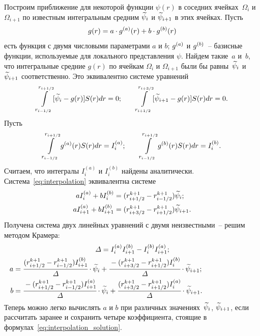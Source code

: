 Построим приближение для некоторой функции $\psi(r)$ в соседних ячейках~$\Omega_i$ и~$\Omega_{i + 1}$ по известным интегральным средним ${\widetilde{\psi}}_i$ и ${\widetilde{\psi}}_{i + 1}$ в этих ячейках. Пусть
\[
    g(r) = a \cdot {g^{(a)}}(r) + b \cdot {g^{(b)}}(r)
\]
есть функция с двумя числовыми параметрами $a$ и $b$; ${g^{(a)}}$ и ${g^{(b)}}$~-- базисные функции, используемые для локального представления $\psi$. Найдем такие~$a$ и~$b$, что интегральные средние $g(r)$ по ячейкам $\Omega_i$ и $\Omega_{i + 1}$ были бы равны~${\widetilde{\psi}}_i$ и~${\widetilde{\psi}}_{i + 1}$ соответственно. Это эквивалентно системе уравнений
\begin{equation}
    \int\limits_{r_{i - 1/2}}^{r_{i + 1/2}} [{\widetilde{\psi}}_i - g(r)] S(r) dr = 0; \qquad \int\limits_{r_{i + 1/2}}^{r_{i + 3/2}} [{\widetilde{\psi}}_{i + 1} - g(r)] S(r) dr = 0.
    \label{eq:interpolation}
\end{equation}
Пусть
\[
    \int\limits_{r_{i - 1/2}}^{r_{i + 1/2}} {g^{(a)}}(r) S(r) dr = I_i^{(a)}; \qquad \int\limits_{r_{i - 1/2}}^{r_{i + 1/2}} {g^{(b)}}(r) S(r) dr = I_i^{(b)}.
\]
Считаем, что интегралы $I_i^{(a)}$ и $I_i^{(b)}$ найдены аналитически. Система~\eqref{eq:interpolation} эквивалентна системе
\begin{align*}
    a I_i^{(a)} + b I_i^{(b)} &= (r_{i + 1/2}^{k + 1} - r_{i - 1/2}^{k + 1}) {\widetilde{\psi}}_i; \\
    a I_{i + 1}^{(a)} + b I_{i + 1}^{(b)} &= (r_{i + 3/2}^{k + 1} - r_{i + 1/2}^{k + 1}) {\widetilde{\psi}}_{i + 1}.
\end{align*}
Получена система двух линейных уравнений с двумя неизвестными~-- решим методом Крамера:
\begin{subequations}
\label{eq:interpolation_solution}
\begin{align}
    \noalign{
        \centering
        $\varDelta = I_i^{(a)} I_{i + 1}^{(b)} - I_i^{(b)} I_{i + 1}^{(a)};$
    }
    a &= \cfrac{(r_{i + 1/2}^{k + 1} - r_{i - 1/2}^{k + 1}) I_{i + 1}^{(b)}}{\varDelta} \cdot \avpsi_i + \cfrac{-(r_{i + 3/2}^{k + 1} - r_{i + 1/2}^{k + 1}) I_i^{(b)}}{\varDelta} \cdot \avpsi_{i + 1}; \\
    b &= \cfrac{-(r_{i + 1/2}^{k + 1} - r_{i - 1/2}^{k + 1}) I_{i + 1}^{(a)}}{\varDelta} \cdot \avpsi_i + \cfrac{(r_{i + 3/2}^{k + 1} - r_{i + 1/2}^{k + 1}) I_i^{(a)}}{\varDelta} \cdot \avpsi_{i + 1}.
\end{align}
\end{subequations}
Теперь можно легко вычислять $a$ и $b$ при различных значениях~${\widetilde{\psi}}_i$, ${\widetilde{\psi}}_{i + 1}$, если рассчитать заранее и сохранить четыре коэффициента, стоящие в формулах~\eqref{eq:interpolation_solution}.

